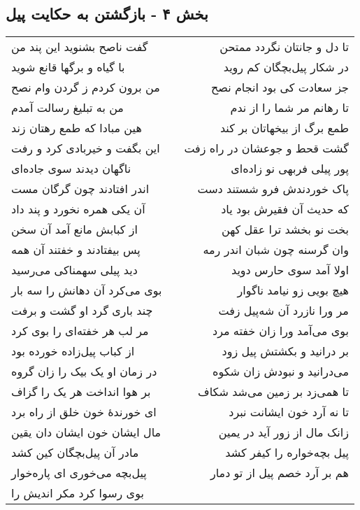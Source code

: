 \begin{center}
\section*{بخش ۴ - بازگشتن به حکایت پیل}
\label{sec:sh004}
\begin{longtable}{l p{0.5cm} r}
گفت ناصح بشنوید این پند من
&&
تا دل و جانتان نگردد ممتحن
\\
با گیاه و برگها قانع شوید
&&
در شکار پیل‌بچگان کم روید
\\
من برون کردم ز گردن وام نصح
&&
جز سعادت کی بود انجام نصح
\\
من به تبلیغ رسالت آمدم
&&
تا رهانم مر شما را از ندم
\\
هین مبادا که طمع رهتان زند
&&
طمع برگ از بیخهاتان بر کند
\\
این بگفت و خیربادی کرد و رفت
&&
گشت قحط و جوعشان در راه زفت
\\
ناگهان دیدند سوی جاده‌ای
&&
پور پیلی فربهی نو زاده‌ای
\\
اندر افتادند چون گرگان مست
&&
پاک خوردندش فرو شستند دست
\\
آن یکی همره نخورد و پند داد
&&
که حدیث آن فقیرش بود یاد
\\
از کبابش مانع آمد آن سخن
&&
بخت نو بخشد ترا عقل کهن
\\
پس بیفتادند و خفتند آن همه
&&
وان گرسنه چون شبان اندر رمه
\\
دید پیلی سهمناکی می‌رسید
&&
اولا آمد سوی حارس دوید
\\
بوی می‌کرد آن دهانش را سه بار
&&
هیچ بویی زو نیامد ناگوار
\\
چند باری گرد او گشت و برفت
&&
مر ورا نازرد آن شه‌پیل زفت
\\
مر لب هر خفته‌ای را بوی کرد
&&
بوی می‌آمد ورا زان خفته مرد
\\
از کباب پیل‌زاده خورده بود
&&
بر درانید و بکشتش پیل زود
\\
در زمان او یک بیک را زان گروه
&&
می‌درانید و نبودش زان شکوه
\\
بر هوا انداخت هر یک را گزاف
&&
تا همی‌زد بر زمین می‌شد شکاف
\\
ای خورندهٔ خون خلق از راه برد
&&
تا نه آرد خون ایشانت نبرد
\\
مال ایشان خون ایشان دان یقین
&&
زانک مال از زور آید در یمین
\\
مادر آن پیل‌بچگان کین کشد
&&
پیل بچه‌خواره را کیفر کشد
\\
پیل‌بچه می‌خوری ای پاره‌خوار
&&
هم بر آرد خصم پیل از تو دمار
\\
بوی رسوا کرد مکر اندیش را

\end{longtable}
\end{center}
